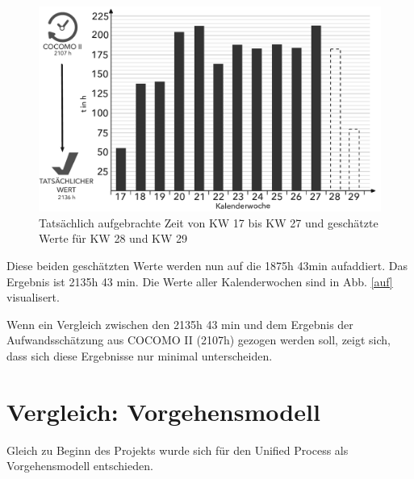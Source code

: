 \documentclass[../review_3.tex]{subfiles}
\begin{document}
\begin{figure} [h]
    \centering
    \includegraphics[width = 0.9\linewidth]{img/Aufwandsschaetzung.pdf}
    \caption{Tatsächlich aufgebrachte Zeit von KW 17 bis KW 27 und geschätzte Werte für KW 28 und KW 29}
    \label{aufw}
\end{figure}
Diese beiden geschätzten Werte werden nun auf die 1875h 43min aufaddiert. Das Ergebnis ist 2135h 43 min. Die Werte aller Kalenderwochen sind in Abb. \ref{auf} visualisert.

Wenn ein Vergleich zwischen den 2135h 43 min und dem Ergebnis der Aufwandsschätzung aus COCOMO II (2107h) gezogen werden soll, zeigt sich, dass sich diese Ergebnisse nur minimal unterscheiden.

\section{Vergleich: Vorgehensmodell}
Gleich zu Beginn des Projekts wurde sich für den Unified Process als Vorgehensmodell entschieden.
\end{document}
